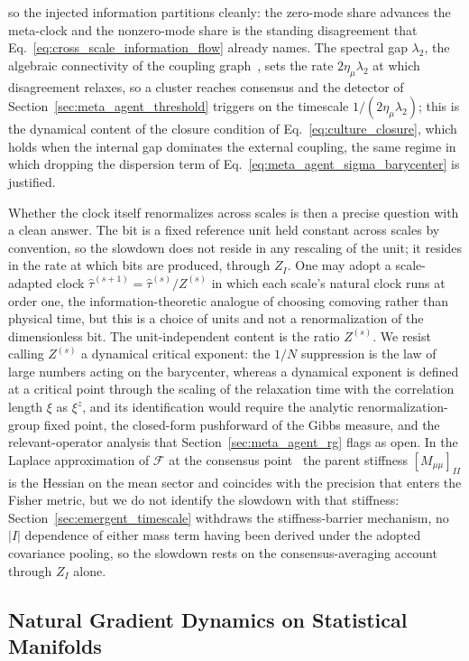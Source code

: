 \documentclass[11pt]{article}
\begin{document}
so the injected information partitions cleanly: the zero-mode share advances the meta-clock and the nonzero-mode share is the standing disagreement that Eq.~\eqref{eq:cross_scale_information_flow} already names. The spectral gap $\lambda_2$, the algebraic connectivity of the coupling graph~\cite{Fiedler1973}, sets the rate $2\eta_\mu\lambda_2$ at which disagreement relaxes, so a cluster reaches consensus and the detector of Section~\ref{sec:meta_agent_threshold} triggers on the timescale $1/(2\eta_\mu\lambda_2)$; this is the dynamical content of the closure condition of Eq.~\eqref{eq:culture_closure}, which holds when the internal gap dominates the external coupling, the same regime in which dropping the dispersion term of Eq.~\eqref{eq:meta_agent_sigma_barycenter} is justified.

Whether the clock itself renormalizes across scales is then a precise question with a clean answer. The bit is a fixed reference unit held constant across scales by convention, so the slowdown does not reside in any rescaling of the unit; it resides in the rate at which bits are produced, through $Z_I$. One may adopt a scale-adapted clock $\hat{\tau}^{(s+1)} = \hat{\tau}^{(s)}/Z^{(s)}$ in which each scale's natural clock runs at order one, the information-theoretic analogue of choosing comoving rather than physical time, but this is a choice of units and not a renormalization of the dimensionless bit. The unit-independent content is the ratio $Z^{(s)}$. We resist calling $Z^{(s)}$ a dynamical critical exponent: the $1/N$ suppression is the law of large numbers acting on the barycenter, whereas a dynamical exponent is defined at a critical point through the scaling of the relaxation time with the correlation length $\xi$ as $\xi^z$, and its identification would require the analytic renormalization-group fixed point, the closed-form pushforward of the Gibbs measure, and the relevant-operator analysis that Section~\ref{sec:meta_agent_rg} flags as open. In the Laplace approximation of $\mathcal{F}$ at the consensus point~\cite[\S2.2.2]{Beal2003} the parent stiffness $[M_{\mu\mu}]_{II}$ is the Hessian on the mean sector and coincides with the precision that enters the Fisher metric, but we do not identify the slowdown with that stiffness: Section~\ref{sec:emergent_timescale} withdraws the stiffness-barrier mechanism, no $|I|$ dependence of either mass term having been derived under the adopted covariance pooling, so the slowdown rests on the consensus-averaging account through $Z_I$ alone.

\subsection{Natural Gradient Dynamics on Statistical Manifolds}
\end{document}
